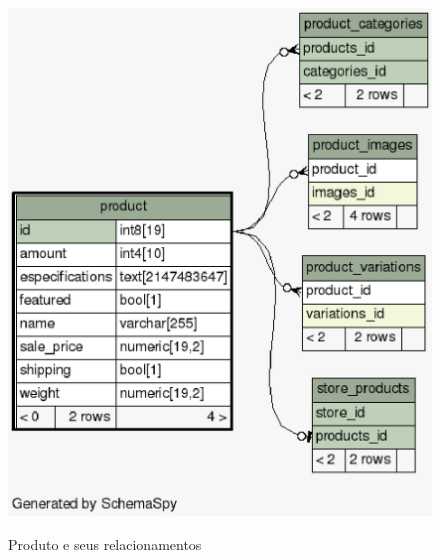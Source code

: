 \documentclass[a4paper,12pt]{monografia}
\begin{document}
\begin{figure}[H]
\centering
\caption{Produto e seus relacionamentos}
\centering
\includegraphics[scale=0.7]{img/diagramas/schema/product.1degree.png.eps}\\
\end{figure}
\end{document}
